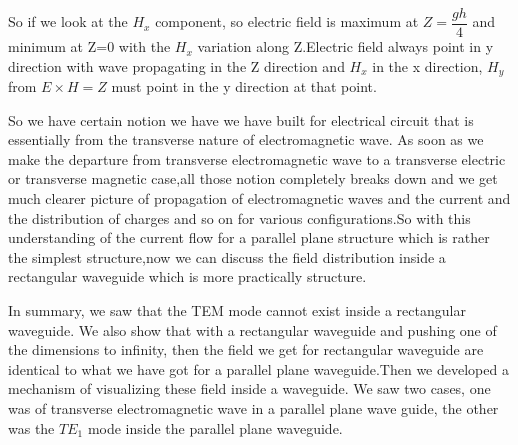 So if we look at the ${H_x}$ component, so electric field is maximum at ${Z= \dfrac{gh}{4}}$ and minimum at Z=0 with the ${H_x}$ variation along Z.Electric field always point in y direction with wave propagating in the Z direction and ${H_x}$ in the x direction, ${H_y}$ from ${E\times H= Z}$ must point in the y direction at that point.

So we have certain notion we have we have built for electrical circuit that is essentially from the transverse nature of electromagnetic wave. As soon as we make the departure from transverse electromagnetic wave to a transverse electric or transverse magnetic case,all those notion completely breaks down and we get much clearer picture of propagation of electromagnetic waves and the current and the distribution of charges and so on for various configurations.So with this understanding of the current flow for a parallel plane structure which is rather the simplest structure,now we can discuss the field distribution inside a rectangular waveguide which is more practically structure.

In summary, we saw that the TEM mode cannot exist inside a rectangular waveguide. We also show that with a rectangular waveguide and pushing one of the dimensions to infinity, then the field we get for rectangular waveguide are identical to what we have got for a parallel plane waveguide.Then we developed a mechanism of visualizing these field inside a waveguide. We saw two cases, one was of transverse electromagnetic wave in a parallel plane wave guide, the other was the ${TE_1}$ mode inside the parallel plane waveguide. 
